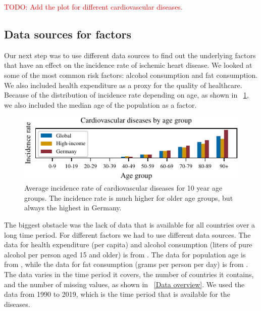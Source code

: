 \textcolor{red}{TODO: Add the plot for different cardiovascular diseases.}

\subsection{Data sources for factors}\label{sec:data_sources}
Our next step was to use different data sources to find out the underlying factors that have an effect on the incidence rate of ischemic heart disease. We looked at some of 
the most common risk factors: alcohol consumption and fat consumption. We also included health expenditure as a proxy for the quality of healthcare. Because of the 
distribution of incidence rate depending on age, as shown in \figurename~\ref{Cardiovascular diseases for age groups}, we also included the median age of the population as a 
factor.

\begin{figure}[ht]
\vskip 0.2in
\begin{center}
\centerline{\includegraphics[width=\columnwidth]{fig/fig_cardiovascular_disease_agerange.pdf}}
\caption{Average incidence rate of cardiovascular diseases for 10 year age groups. The incidence rate is much higher for older age groups, but 
always the highest in Germany.}
\label{Cardiovascular diseases for age groups}
\end{center}
\vskip -0.2in
\end{figure}

The biggest obstacle was the lack of data that is available for all countries over a long time period. For different factors we had to use different data sources.
The data for health expenditure (per capita) and alcohol consumption (liters of pure alcohol per person aged 15 and older) is from \citet{oecd}. 
The data for population age is from \citet{age}, while the data for fat consumption (grams per person per day) is from \citet{fat_consumption}. The data varies in the time period it covers,
the number of countries it contains, and the number of missing values, as shown in \tablename~\ref{Data overview}. We used the data from 1990 to 2019, which is the time period
that is available for the diseases.

